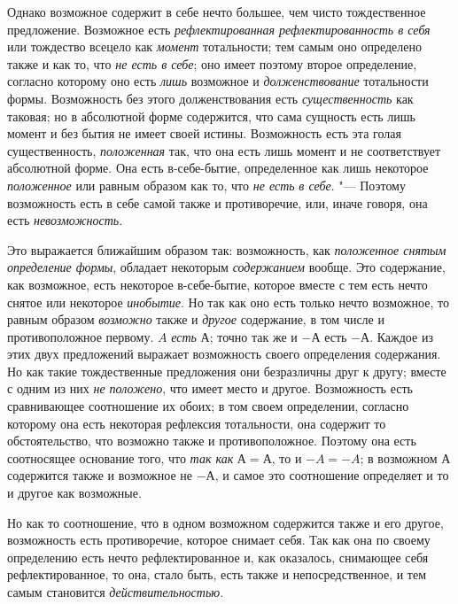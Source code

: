Однако возможное содержит в себе нечто большее, чем чисто тождественное
предложение. Возможное есть {\em рефлектированная
рефлектированность в себя} или тождество всецело как
{\em момент} тотальности; тем самым оно определено
также и как то, что {\em не есть в себе}; оно имеет
поэтому второе определение, согласно которому оно есть
{\em лишь} возможное и
{\em долженствование} тотальности формы. Возможность
без этого долженствования есть {\em существенность} как
таковая; но в абсолютной форме содержится, что сама сущность есть лишь
момент и без бытия не имеет своей истины. Возможность есть эта голая
существенность, {\em положенная} так, что она есть лишь
момент и не соответствует абсолютной форме. Она есть в-себе-бытие,
определенное как лишь некоторое {\em положенное} или
равным образом как то, что {\em не есть}
{\em в себе}. "--- Поэтому возможность есть в себе самой
также и противоречие, или, иначе говоря, она есть
{\em невозможность}.

Это выражается ближайшим образом так: возможность, как
{\em положенное снятым определение формы}, обладает
некоторым {\em содержанием} вообще. Это содержание, как
возможное, есть некоторое в-себе-бытие, которое вместе с тем есть нечто
снятое или некоторое {\em инобытие}. Но так как оно
есть только нечто возможное, то равным образом
{\em возможно} также и {\em другое}
содержание, в том числе и противоположное первому. $A$ {\em есть}
$А$; точно так же и $-А$ есть $-А$. Каждое из этих двух
предложений выражает возможность своего определения содержания. Но как
такие тождественные предложения они безразличны друг к другу; вместе с
одним из них {\em не положено}, что имеет место и
другое. Возможность есть сравнивающее соотношение их обоих; в том своем
определении, согласно которому она есть некоторая рефлексия тотальности,
она содержит то обстоятельство, что возможно также и противоположное.
Поэтому она есть соотносящее основание того, что
{\em так как} $А=А$, то и
$-A=-A$; в возможном $А$ содержится также и
возможное не $-А$, и самое это соотношение определяет и то и другое
как возможные.

Но как то соотношение, что в одном возможном содержится также и его другое,
возможность есть противоречие, которое снимает себя. Так как она по своему
определению есть нечто рефлектированное и, как оказалось, снимающее себя
рефлектированное, то она, стало быть, есть также и непосредственное, и тем
самым становится {\em действительностью}.

